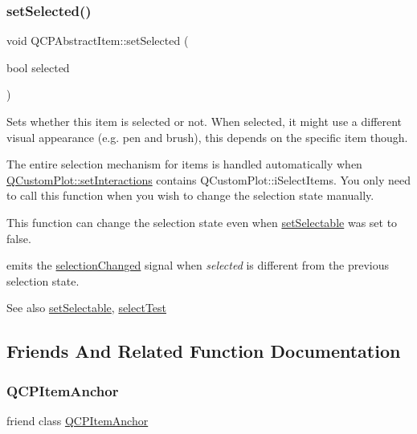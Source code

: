 \subsubsection{\texorpdfstring{setSelected()}{setSelected()}}
{\footnotesize\ttfamily void Q\+C\+P\+Abstract\+Item\+::set\+Selected (\begin{DoxyParamCaption}\item[{bool}]{selected }\end{DoxyParamCaption})}

Sets whether this item is selected or not. When selected, it might use a different visual appearance (e.\+g. pen and brush), this depends on the specific item though.

The entire selection mechanism for items is handled automatically when \mbox{\hyperlink{class_q_custom_plot_a5ee1e2f6ae27419deca53e75907c27e5}{Q\+Custom\+Plot\+::set\+Interactions}} contains Q\+Custom\+Plot\+::i\+Select\+Items. You only need to call this function when you wish to change the selection state manually.

This function can change the selection state even when \mbox{\hyperlink{class_q_c_p_abstract_item_a8a8e32a55bc478b849756a78c2d87fd2}{set\+Selectable}} was set to false.

emits the \mbox{\hyperlink{class_q_c_p_abstract_item_aa5cffb034fc65dbb91c77e02c1c14251}{selection\+Changed}} signal when {\itshape selected} is different from the previous selection state.

\begin{DoxySeeAlso}{See also}
\mbox{\hyperlink{class_q_c_p_abstract_item_a8a8e32a55bc478b849756a78c2d87fd2}{set\+Selectable}}, \mbox{\hyperlink{class_q_c_p_abstract_item_ae41d0349d68bb802c49104afd100ba2a}{select\+Test}} 
\end{DoxySeeAlso}


\subsection{Friends And Related Function Documentation}
\mbox{\label{class_q_c_p_abstract_item_a61767d414fd57af9eb1741b34268c7fc}} 
\subsubsection{\texorpdfstring{QCPItemAnchor}{QCPItemAnchor}}
{\footnotesize\ttfamily friend class \mbox{\hyperlink{class_q_c_p_item_anchor}{Q\+C\+P\+Item\+Anchor}}\hspace{0.3cm}{\ttfamily [friend]}}

